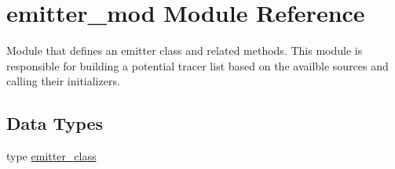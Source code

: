 \hypertarget{namespaceemitter__mod}{}\section{emitter\+\_\+mod Module Reference}
\label{namespaceemitter__mod}


Module that defines an emitter class and related methods. This module is responsible for building a potential tracer list based on the availble sources and calling their initializers.  


\subsection*{Data Types}
\begin{DoxyCompactItemize}
\item 
type \mbox{\hyperlink{structemitter__mod_1_1emitter__class}{emitter\+\_\+class}}
\end{DoxyCompactItemize}
